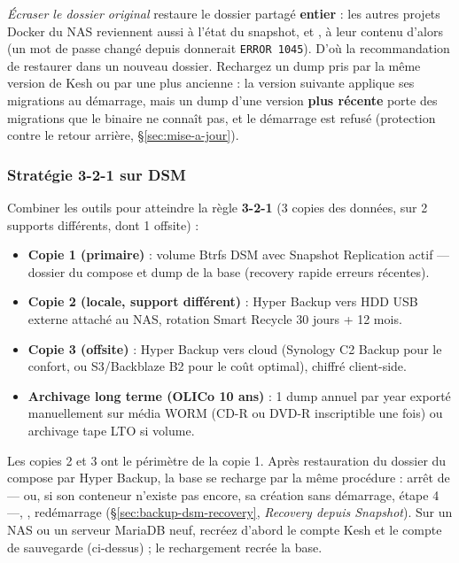 \documentclass[a4paper,11pt,oneside]{article}
\begin{document}
\emph{Écraser le dossier original} restaure le dossier partagé  \textbf{entier} : les autres projets Docker du NAS reviennent aussi à l'état du snapshot, et ,  à leur contenu d'alors (un mot de passe changé depuis donnerait \texttt{ERROR 1045}). D'où la recommandation de restaurer dans un nouveau dossier. Rechargez un dump pris par la même version de Kesh ou par une plus ancienne : la version suivante applique ses migrations au démarrage, mais un dump d'une version \textbf{plus récente} porte des migrations que le binaire ne connaît pas, et le démarrage est refusé (protection contre le retour arrière, \S\ref{sec:mise-a-jour}).

\subsubsection{Stratégie 3-2-1 sur DSM}

Combiner les outils pour atteindre la règle \textbf{3-2-1} (3 copies des données, sur 2 supports différents, dont 1 offsite) :

\begin{itemize}
    \item \textbf{Copie 1 (primaire)} : volume Btrfs DSM avec Snapshot Replication actif --- dossier du compose et dump de la base (recovery rapide erreurs récentes).
    \item \textbf{Copie 2 (locale, support différent)} : Hyper Backup vers HDD USB externe attaché au NAS, rotation Smart Recycle 30 jours + 12 mois.
    \item \textbf{Copie 3 (offsite)} : Hyper Backup vers cloud (Synology C2 Backup pour le confort, ou S3/Backblaze B2 pour le coût optimal), chiffré client-side.
    \item \textbf{Archivage long terme (OLICo 10 ans)} : 1 dump annuel par year exporté manuellement sur média WORM (CD-R ou DVD-R inscriptible une fois) ou archivage tape LTO si volume.
\end{itemize}

Les copies 2 et 3 ont le périmètre de la copie 1. Après restauration du dossier du compose par Hyper Backup, la base se recharge par la même procédure : arrêt de  --- ou, si son conteneur n'existe pas encore, sa création sans démarrage, étape 4 ---, , redémarrage (\S\ref{sec:backup-dsm-recovery}, \emph{Recovery depuis Snapshot}). Sur un NAS ou un serveur MariaDB neuf, recréez d'abord le compte Kesh et le compte de sauvegarde (ci-dessus) ; le rechargement recrée la base.
\end{document}
